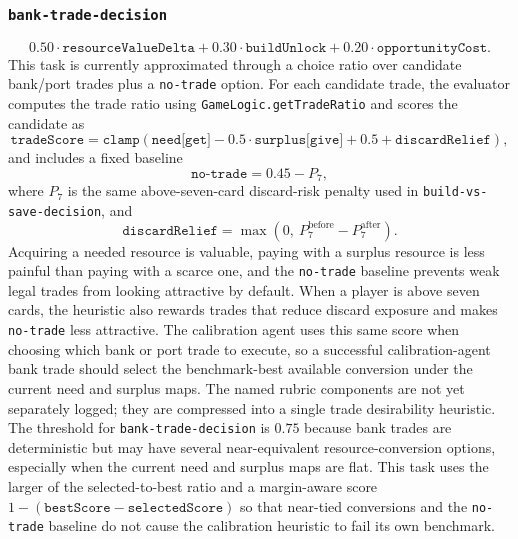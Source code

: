 \documentclass{article}
\begin{document}
\subsubsection{\texttt{bank-trade-decision}}
\label{app:task-bank-trade-decision}
\[
0.50 \cdot \texttt{resourceValueDelta} +
0.30 \cdot \texttt{buildUnlock} +
0.20 \cdot \texttt{opportunityCost}.
\]
This task is currently approximated through a choice ratio over candidate bank/port trades plus a \texttt{no-trade} option. For each candidate trade, the evaluator computes the trade ratio using \texttt{GameLogic.getTradeRatio} and scores the candidate as
\[
\texttt{tradeScore}
= \texttt{clamp}\left(
\texttt{need[get]} - 0.5 \cdot \texttt{surplus[give]} + 0.5 + \texttt{discardRelief}
\right),
\]
and includes a fixed baseline
\[
\texttt{no-trade} = 0.45 - P_7,
\]
where \(P_7\) is the same above-seven-card discard-risk penalty used in \texttt{build-vs-save-decision}, and
\[
\texttt{discardRelief} = \max(0,\ P_7^{\text{before}} - P_7^{\text{after}}).
\]
Acquiring a needed resource is valuable, paying with a surplus resource is less painful than paying with a scarce one, and the \texttt{no-trade} baseline prevents weak legal trades from looking attractive by default. When a player is above seven cards, the heuristic also rewards trades that reduce discard exposure and makes \texttt{no-trade} less attractive. The calibration agent uses this same score when choosing which bank or port trade to execute, so a successful calibration-agent bank trade should select the benchmark-best available conversion under the current need and surplus maps.
The named rubric components are not yet separately logged; they are compressed into a single trade desirability heuristic.
\\
The threshold for \texttt{bank-trade-decision} is $0.75$ because bank trades are deterministic but may have several near-equivalent resource-conversion options, especially when the current need and surplus maps are flat. This task uses the larger of the selected-to-best ratio and a margin-aware score $1-(\texttt{bestScore}-\texttt{selectedScore})$ so that near-tied conversions and the \texttt{no-trade} baseline do not cause the calibration heuristic to fail its own benchmark.
\end{document}
